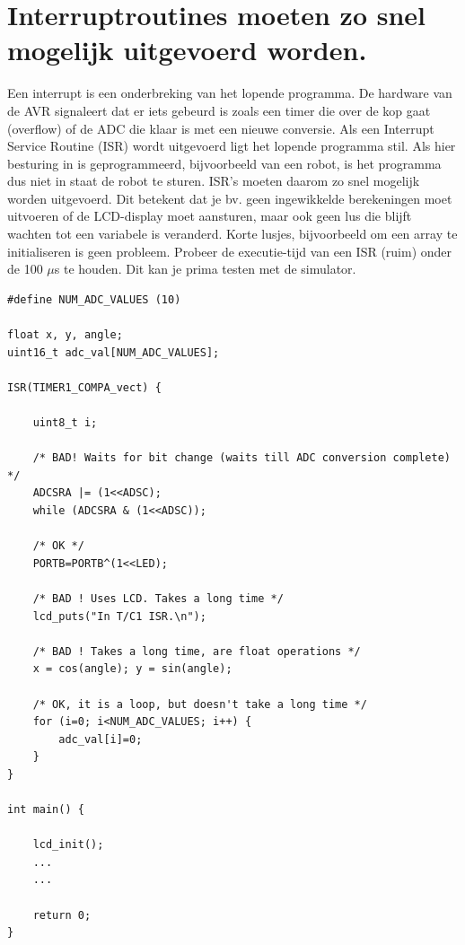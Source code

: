 \documentclass[12pt,a4paper,final,twoside,fleqn]{article}
\begin{document}
\section{Interruptroutines moeten zo snel mogelijk uitgevoerd worden.}
\label{sec:intsnel}
Een interrupt is een onderbreking van het lopende programma. De hardware
van de AVR signaleert dat er iets gebeurd is zoals een timer die over de
kop gaat (overflow) of de ADC die klaar is met een nieuwe conversie. Als
een Interrupt Service Routine (ISR) wordt uitgevoerd ligt het lopende
programma stil. Als hier besturing in is geprogrammeerd, bijvoorbeeld van
een robot, is het programma dus niet in staat de robot te sturen. ISR's
moeten daarom zo snel mogelijk worden uitgevoerd. Dit betekent dat je bv.
geen ingewikkelde berekeningen moet uitvoeren of de LCD-display moet
aansturen, maar ook geen lus die blijft wachten tot een variabele is
veranderd. Korte lusjes, bijvoorbeeld om een array te initialiseren is
geen probleem. Probeer de executie-tijd van een ISR (ruim) onder de 100
$\mu$s te houden. Dit kan je prima testen met de simulator.

\begin{lstlisting}[style=C,caption=ISR's moeten kort duren]
#define NUM_ADC_VALUES (10)

float x, y, angle;
uint16_t adc_val[NUM_ADC_VALUES];

ISR(TIMER1_COMPA_vect) {

	uint8_t i;

	/* BAD! Waits for bit change (waits till ADC conversion complete) */
	ADCSRA |= (1<<ADSC);
	while (ADCSRA & (1<<ADSC));	

	/* OK */
	PORTB=PORTB^(1<<LED);

	/* BAD ! Uses LCD. Takes a long time */
	lcd_puts("In T/C1 ISR.\n");

	/* BAD ! Takes a long time, are float operations */
	x = cos(angle); y = sin(angle);

	/* OK, it is a loop, but doesn't take a long time */
	for (i=0; i<NUM_ADC_VALUES; i++) {
		adc_val[i]=0;
	}
}

int main() {

	lcd_init();
	...
	...
	
	return 0;
}
\end{lstlisting}

\end{document}
